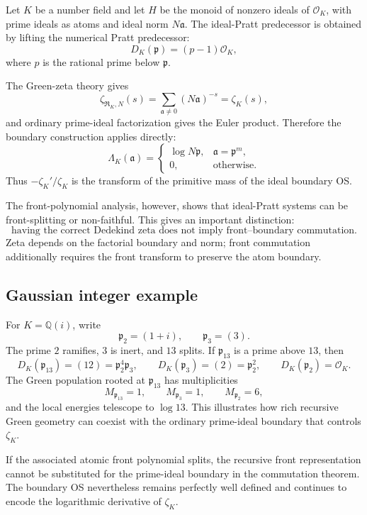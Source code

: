 \documentclass[11pt]{article}
\newcommand{\cR}{\mathfrak R}
\newcommand{\Lam}{\Lambda}
\begin{document}
Let $K$ be a number field and let $H$ be the monoid of nonzero ideals of $\mathcal O_K$, with prime ideals as atoms and ideal norm $N\mathfrak a$. The ideal-Pratt predecessor is obtained by lifting the numerical Pratt predecessor:
\[
D_K(\mathfrak p)=(p-1)\mathcal O_K,
\]
where $p$ is the rational prime below $\mathfrak p$.

The Green-zeta theory gives
\[
\zeta_{\cR_K,N}(s)
=
\sum_{\mathfrak a\ne0}(N\mathfrak a)^{-s}
=
\zeta_K(s),
\]
and ordinary prime-ideal factorization gives the Euler product. Therefore the boundary construction applies directly:
\[
\Lam_K(\mathfrak a)=
\begin{cases}
\log N\mathfrak p,&\mathfrak a=\mathfrak p^m,\\
0,&\text{otherwise}.
\end{cases}
\]
Thus $-\zeta_K'/\zeta_K$ is the transform of the primitive mass of the ideal boundary OS.

The front-polynomial analysis, however, shows that ideal-Pratt systems can be front-splitting or non-faithful. This gives an important distinction:
\[
\boxed{
\text{having the correct Dedekind zeta does not imply front--boundary commutation}.}
\]
Zeta depends on the factorial boundary and norm; front commutation additionally requires the front transform to preserve the atom boundary.

\subsection{Gaussian integer example}

For $K=\mathbb Q(i)$, write
\[
\mathfrak p_2=(1+i),\qquad \mathfrak p_3=(3).
\]
The prime $2$ ramifies, $3$ is inert, and $13$ splits. If $\mathfrak p_{13}$ is a prime above $13$, then
\[
D_K(\mathfrak p_{13})=(12)
=\mathfrak p_2^4\mathfrak p_3,
\qquad
D_K(\mathfrak p_3)=(2)=\mathfrak p_2^2,
\qquad
D_K(\mathfrak p_2)=\mathcal O_K.
\]
The Green population rooted at $\mathfrak p_{13}$ has multiplicities
\[
M_{\mathfrak p_{13}}=1,\qquad
M_{\mathfrak p_3}=1,\qquad
M_{\mathfrak p_2}=6,
\]
and the local energies telescope to $\log13$. This illustrates how rich recursive Green geometry can coexist with the ordinary prime-ideal boundary that controls $\zeta_K$.

If the associated atomic front polynomial splits, the recursive front representation cannot be substituted for the prime-ideal boundary in the commutation theorem. The boundary OS nevertheless remains perfectly well defined and continues to encode the logarithmic derivative of $\zeta_K$.
\end{document}
